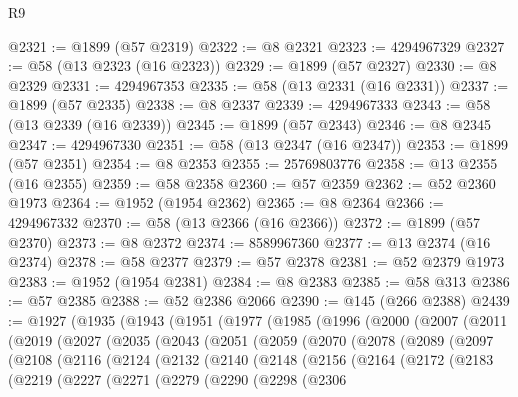 \begin{lexlean}{R9}
\begin{coremodule}
@2321 := @1899 (@57 @2319)
@2322 := @8 @2321
@2323 := 4294967329
@2327 := @58 (@13 @2323 (@16 @2323))
@2329 := @1899 (@57 @2327)
@2330 := @8 @2329
@2331 := 4294967353
@2335 := @58 (@13 @2331 (@16 @2331))
@2337 := @1899 (@57 @2335)
@2338 := @8 @2337
@2339 := 4294967333
@2343 := @58 (@13 @2339 (@16 @2339))
@2345 := @1899 (@57 @2343)
@2346 := @8 @2345
@2347 := 4294967330
@2351 := @58 (@13 @2347 (@16 @2347))
@2353 := @1899 (@57 @2351)
@2354 := @8 @2353
@2355 := 25769803776
@2358 := @13 @2355 (@16 @2355)
@2359 := @58 @2358
@2360 := @57 @2359
@2362 := @52 @2360 @1973
@2364 := @1952 (@1954 @2362)
@2365 := @8 @2364
@2366 := 4294967332
@2370 := @58 (@13 @2366 (@16 @2366))
@2372 := @1899 (@57 @2370)
@2373 := @8 @2372
@2374 := 8589967360
@2377 := @13 @2374 (@16 @2374)
@2378 := @58 @2377
@2379 := @57 @2378
@2381 := @52 @2379 @1973
@2383 := @1952 (@1954 @2381)
@2384 := @8 @2383
@2385 := @58 @313
@2386 := @57 @2385
@2388 := @52 @2386 @2066
@2390 := @145 (@266 @2388)
@2439 := @1927
    (@1935
      (@1943
        (@1951
          (@1977
            (@1985
              (@1996
                (@2000
                  (@2007
                    (@2011
                      (@2019
                        (@2027
                          (@2035
                            (@2043
                              (@2051
                                (@2059
                                  (@2070
                                    (@2078
                                      (@2089
                                        (@2097
                                          (@2108
                                            (@2116
                                              (@2124
                                                (@2132
                                                  (@2140
                                                    (@2148
                                                      (@2156
                                                        (@2164
                                                          (@2172
                                                            (@2183
                                                              (@2219
                                                                (@2227
                                                                  (@2271
                                                                    (@2279
                                                                      (@2290
                                                                        (@2298
                                                                          (@2306

\end{coremodule}
\end{lexlean}
